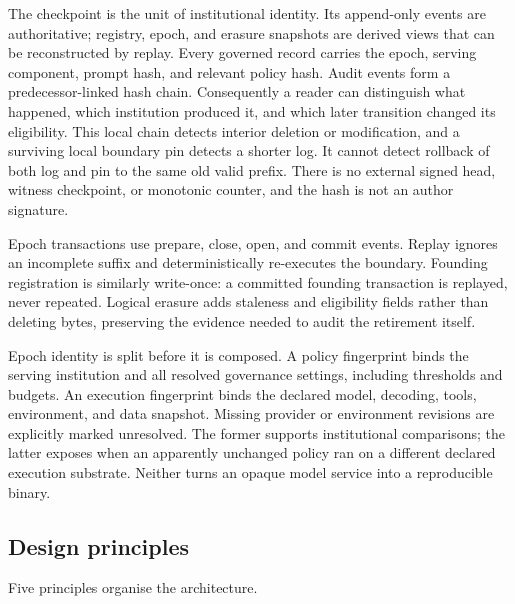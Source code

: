 The checkpoint is the unit of institutional identity. Its append-only
events are authoritative; registry, epoch, and erasure snapshots are
derived views that can be reconstructed by replay. Every governed record
carries the epoch, serving component, prompt hash, and relevant policy
hash. Audit events form a predecessor-linked hash chain. Consequently a
reader can distinguish what happened, which institution produced it, and
which later transition changed its eligibility. This local chain detects
interior deletion or modification, and a surviving local boundary pin
detects a shorter log. It cannot detect rollback of both log and pin to
the same old valid prefix. There is no external signed head, witness
checkpoint, or monotonic counter, and the hash is not an author signature.

Epoch transactions use prepare, close, open, and commit events. Replay
ignores an incomplete suffix and deterministically re-executes the
boundary. Founding registration is similarly write-once: a committed
founding transaction is replayed, never repeated. Logical erasure adds
staleness and eligibility fields rather than deleting bytes, preserving
the evidence needed to audit the retirement itself.

Epoch identity is split before it is composed. A policy fingerprint binds
the serving institution and all resolved governance settings, including
thresholds and budgets. An execution fingerprint binds the declared model,
decoding, tools, environment, and data snapshot. Missing provider or
environment revisions are explicitly marked unresolved. The former supports
institutional comparisons; the latter exposes when an apparently unchanged
policy ran on a different declared execution substrate. Neither turns an
opaque model service into a reproducible binary.

\subsection{Design principles}\label{sec:overview:principles}

Five principles organise the architecture.

